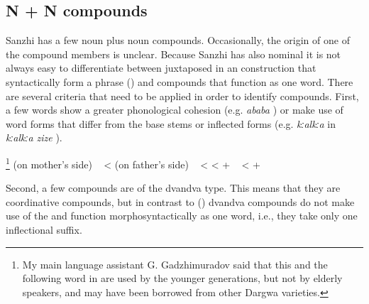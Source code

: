 
\subsection{N + N compounds}
\label{ssec:Nounnoun compounds}

Sanzhi has a few noun plus noun compounds. Occasionally, the origin of one of the compound members is unclear. Because Sanzhi has also nominal  it is not always easy to differentiate between juxtaposed  in an  construction that syntactically form a phrase () and compounds that function as one word. There are several criteria that need to be applied in order to identify compounds. First, a few words show a greater phonological cohesion (e.g. \textit{ababa} ) or make use of word forms that differ from the base stems or inflected forms (e.g. \textit{kːalkːa} in \textit{kːalkːa zize} ).
%
\begin{exe}
	\ex	\label{ex:kːalkːa zizeraspberry}
	\begin{xlist}
		\TabPositions{10em,12em}
		\ex	{}\footnote{My main language assistant G. Gadzhimuradov said that this and the following word in  are used by the younger generations, but not by elderly speakers, and may have been borrowed from other Dargwa varieties.}  (on mother's side)
		\sn	~\hspace*{1em}					\tab	<	\tab	{} 
				\ex	\label{ex:ATTABAphon}   (on father's side)
		\sn	~\hspace*{1em}	\tab	<	\tab	{} 
		\ex	{} 			\tab	<	\tab	{}  +  
		\ex	{} 
		\sn	~\hspace*{1em}					\tab	<	\tab	{}  +  
	\end{xlist}
\end{exe}

Second, a few compounds are of the dvandva type. This means that they are coordinative compounds, but in contrast to   () dvandva compounds do not make use of the  and function morphosyntactically as one word, i.e., they take only one inflectional suffix.

